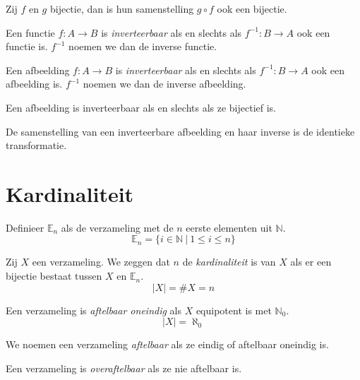 \documentclass[main.tex]{subfiles}
\begin{document}
\begin{st}
  Zij $f$ en $g$ bijectie, dan is hun samenstelling $g \circ f$ ook een bijectie.
\end{st}

\begin{de}
  Een functie $f: A \rightarrow B$ is \emph{inverteerbaar} als en slechts als $f^{-1}: B \rightarrow A$ ook een functie is. $f^{-1}$ noemen we dan de inverse functie.
\end{de}

\begin{de}
  Een afbeelding $f: A \rightarrow B$ is \emph{inverteerbaar} als en slechts als $f^{-1}: B \rightarrow A$ ook een afbeelding is. $f^{-1}$ noemen we dan de inverse afbeelding.
\end{de}

\begin{st}
  \label{st:afb-inverse-asa-bijectief}
  Een afbeelding is inverteerbaar als en slechts als ze bijectief is.
\end{st}

\begin{st}
  \label{st:afb+inverse=identieke}
  De samenstelling van een inverteerbare afbeelding en haar inverse is de identieke transformatie.
\end{st}



\section{Kardinaliteit}
\label{sec:kardinaliteit}

\begin{de}
  Definieer $\mathbb{E}_{n}$ als de verzameling met de $n$ eerste elementen uit $\mathbb{N}$.
  \[ \mathbb{E}_{n} = \{ i \in \mathbb{N}\ |\ 1 \le i \le n \}\] 
\end{de}

\begin{de}
  Zij $X$ een verzameling. We zeggen dat $n$ de \emph{kardinaliteit} is van $X$ als er een bijectie bestaat tussen $X$ en $\mathbb{E}_{n}$.
  \[ |X| = \#X = n \]
\end{de}

\begin{de}
  Een verzameling is \emph{aftelbaar oneindig} als $X$ equipotent is met $\mathbb{N}_{0}$.
  \[ |X| = \aleph_{0} \]
\end{de}

\begin{de}
  We noemen een verzameling \emph{aftelbaar} als ze eindig of aftelbaar oneindig is. 
\end{de}

\begin{de}
  Een verzameling is \emph{overaftelbaar} als ze nie aftelbaar is.
\end{de}
\end{document}
